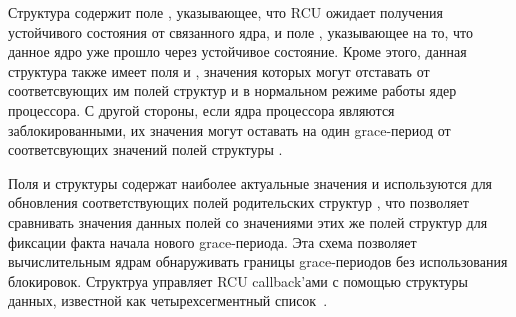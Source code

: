 Структура  содержит поле , указывающее,
что RCU ожидает получения устойчивого состояния от связанного ядра,
и поле , указывающее на то, что данное ядро уже
прошло через устойчивое состояние.
%
Кроме этого, данная структура также имеет поля  и ,
значения которых могут отставать от соответсвующих им полей структур
 и  в нормальном режиме работы ядер процессора.
С другой стороны, если ядра процессора являются заблокированными,
их значения могут оставать на один grace-период от соответсвующих значений
полей структуры .

Поля  и  структуры  содержат наиболее
актуальные значения и используются для обновления соответствующих полей родительских
структур , что позволяет сравнивать значения данных полей со значениями
этих же полей структур  для фиксации факта начала нового grace-периода.
Эта схема позволяет вычислительным ядрам обнаруживать границы grace-периодов
без использования блокировок.
%
Структруа  управляет RCU callback'ами с помощью
структуры данных, известной как четырехсегментный
список~\cite{LaiJiangshan2008NewClassicAlgorithm}.



